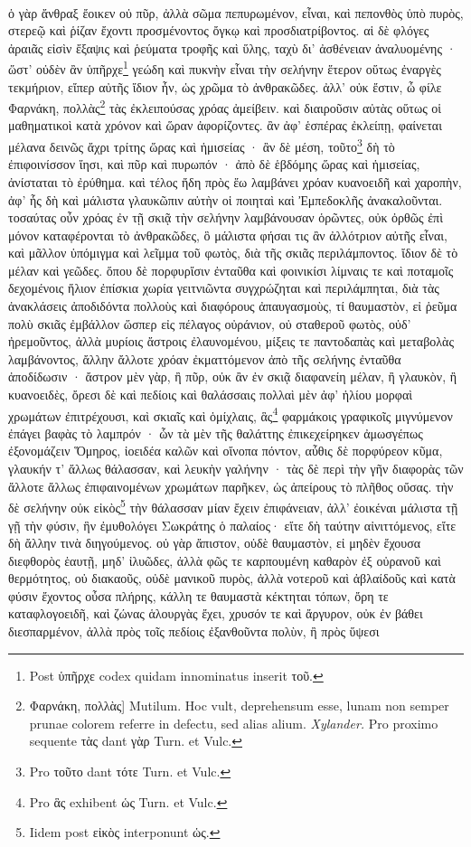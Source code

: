 \documentclass[a4paper, 11pt, oneside, polutonikogreek, german]{article}
\begin{document}
\paragraph{}
ὁ γὰρ ἄνθραξ ἔοικεν οὐ πῦρ, ἀλλὰ σῶμα πεπυρωμένον, εἶναι, καὶ πεπονθὸς ὑπὸ πυρὸς, στερεῷ καὶ ῥίζαν ἔχοντι προσμένοντος ὄγκῳ καὶ προσδιατρίβοντος. αἱ δὲ φλόγες ἀραιᾶς εἰσὶν ἔξαψις καὶ ῥεύματα τροφῆς καὶ ὕλης, ταχὺ δι' ἀσθένειαν ἀναλυομένης · ὥστ' οὐδὲν ἂν ὑπῆρχε\footnote{Post ὑπῆρχε codex quidam innominatus inserit τοῦ.} γεώδη καὶ πυκνὴν εἶναι τὴν σελήνην ἕτερον οὕτως ἐναργὲς τεκμήριον, εἴπερ αὐτῆς ἴδιον ἦν, ὡς χρῶμα τὸ ἀνθρακῶδες. ἀλλ' οὐκ ἔστιν, ὦ φίλε Φαρνάκη, πολλὰς\footnote{Φαρνάκη, πολλὰς] Mutilum. Hoc vult, deprehensum esse, lunam non semper prunae colorem referre in defectu, sed alias alium. \emph{Xylander.} Pro proximo sequente τὰς dant γὰρ Turn. et Vulc.} τὰς ἐκλειπούσας χρόας ἀμείβειν. καὶ διαιροῦσιν αὐτὰς οὕτως οἱ μαθηματικοὶ κατὰ χρόνον καὶ ὥραν ἀφορίζοντες. ἂν ἀφ' ἑσπέρας ἐκλείπῃ, φαίνεται μέλανα δεινῶς ἄχρι τρίτης ὥρας καὶ ἡμισείας · ἂν δὲ μέση, τοῦτο\footnote{Pro τοῦτο dant τότε Turn. et Vulc.} δὴ τὸ ἐπιφοινίσσον ἵησι, καὶ πῦρ καὶ πυρωπόν · ἀπὸ δὲ ἑβδόμης ὥρας καὶ ἡμισείας, ἀνίσταται τὸ ἐρύθημα. καὶ τέλος ἤδη πρὸς ἕω λαμβάνει χρόαν κυανοειδῆ καὶ χαροπὴν, ἀφ' ἧς δὴ καὶ μάλιστα γλαυκῶπιν αὐτὴν οἱ ποιηταὶ καὶ Ἐμπεδοκλῆς ἀνακαλοῦνται. τοσαύτας οὖν χρόας ἐν τῇ σκιᾷ τὴν σελήνην λαμβάνουσαν ὁρῶντες, οὐκ ὀρθῶς ἐπὶ μόνον καταφέρονται τὸ ἀνθρακῶδες, ὃ μάλιστα φήσαι τις ἂν ἀλλότριον αὐτῆς εἶναι, καὶ μᾶλλον ὑπόμιγμα καὶ λεῖμμα τοῦ φωτὸς, διὰ τῆς σκιᾶς περιλάμποντος. ἴδιον δὲ τὸ μέλαν καὶ γεῶδες. ὅπου δὲ πορφυρἴσιν ἐνταῦθα καὶ φοινικίσι λίμναις τε καὶ ποταμοῖς δεχομένοις ἥλιον ἐπίσκια χωρία γειτνιῶντα συγχρώζηται καὶ περιλάμπηται, διὰ τὰς ἀνακλάσεις ἀποδιδόντα πολλοὺς καὶ διαφόρους ἀπαυγασμοὺς, τί θαυμαστὸν, εἰ ῥεῦμα πολὺ σκιᾶς ἐμβάλλον ὥσπερ εἰς πέλαγος οὐράνιον, οὐ σταθεροῦ φωτὸς, οὐδ' ἠρεμοῦντος, ἀλλὰ μυρίοις ἄστροις ἐλαυνομένου, μίξεις τε παντοδαπὰς καὶ μεταβολὰς λαμβάνοντος, ἄλλην ἄλλοτε χρόαν ἐκματτόμενον ἀπὸ τῆς σελήνης ἐνταῦθα ἀποδίδωσιν · ἄστρον μὲν γὰρ, ἢ πῦρ, οὐκ ἂν ἐν σκιᾷ διαφανείη μέλαν, ἢ γλαυκὸν, ἢ κυανοειδὲς, ὄρεσι δὲ καὶ πεδίοις καὶ θαλάσσαις πολλαὶ μὲν ἀφ' ἡλίου μορφαὶ χρωμάτων ἐπιτρέχουσι, καὶ σκιαῖς καὶ ὁμίχλαις, ἃς\footnote{Pro ἃς exhibent ὡς Turn. et Vulc.} φαρμάκοις γραφικοῖς μιγνύμενον ἐπάγει βαφὰς τὸ λαμπρόν · ὧν τὰ μὲν τῆς θαλάττης ἐπικεχείρηκεν ἀμωσγέπως ἐξονομάζειν Ὅμηρος, ἰοειδέα καλῶν καὶ οἴνοπα πόντον, αὖθις δὲ πορφύρεον κῦμα, γλαυκήν τ' ἄλλως θάλασσαν, καὶ λευκὴν γαλήνην · τὰς δὲ περὶ τὴν γῆν διαφορὰς τῶν ἄλλοτε ἄλλως ἐπιφαινομένων χρωμάτων παρῆκεν, ὡς ἀπείρους τὸ πλῆθος οὔσας. τὴν δὲ σελήνην οὐκ εἰκὸς\footnote{Iidem post εἰκὸς interponunt ὡς.} τὴν θάλασσαν μίαν ἔχειν ἐπιφάνειαν, ἀλλ' ἐοικέναι μάλιστα τῇ γῇ τὴν φύσιν, ἣν ἐμυθολόγει Σωκράτης ὁ παλαίος· εἴτε δὴ ταύτην αἰνιττόμενος, εἴτε δὴ ἄλλην τινὰ διηγούμενος. οὐ γὰρ ἄπιστον, οὐδὲ θαυμαστὸν, εἰ μηδὲν ἔχουσα διεφθορὸς ἑαυτῇ, μηδ' ἰλυῶδες, ἀλλὰ φῶς τε καρπουμένη καθαρὸν ἐξ οὐρανοῦ καὶ θερμότητος, οὐ διακαοῦς, οὐδὲ μανικοῦ πυρὸς, ἀλλὰ νοτεροῦ καὶ ἀβλαίδοῦς καὶ κατὰ φύσιν ἔχοντος οὖσα πλήρης, κάλλη τε θαυμαστὰ κέκτηται τόπων, ὄρη τε καταφλογοειδῆ, καὶ ζώνας ἁλουργὰς ἔχει, χρυσόν τε καὶ ἄργυρον, οὐκ ἐν βάθει διεσπαρμένον, ἀλλὰ πρὸς τοῖς πεδίοις ἐξανθοῦντα πολὺν, ἢ πρὸς ὕψεσι 
\end{document}
